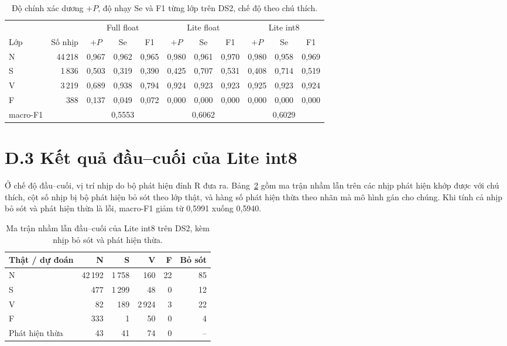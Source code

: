 \begin{table}[htbp]\centering
\caption{Độ chính xác dương $+P$, độ nhạy Se và F1 từng lớp trên DS2, chế độ theo chú thích.}\label{tab:pld-prf}
\small\setlength{\tabcolsep}{4pt}\begin{tabular}{@{}lrccccccccc@{}}\toprule
 & & \multicolumn{3}{c}{Full float} & \multicolumn{3}{c}{Lite float} & \multicolumn{3}{c}{Lite int8} \\
\cmidrule(lr){3-5}\cmidrule(lr){6-8}\cmidrule(l){9-11}
Lớp & Số nhịp & $+P$ & Se & F1 & $+P$ & Se & F1 & $+P$ & Se & F1 \\ \midrule
N & 44\,218 & 0{,}967 & 0{,}962 & 0{,}965 & 0{,}980 & 0{,}961 & 0{,}970 & 0{,}980 & 0{,}958 & 0{,}969 \\
S & 1\,836 & 0{,}503 & 0{,}319 & 0{,}390 & 0{,}425 & 0{,}707 & 0{,}531 & 0{,}408 & 0{,}714 & 0{,}519 \\
V & 3\,219 & 0{,}689 & 0{,}938 & 0{,}794 & 0{,}924 & 0{,}923 & 0{,}923 & 0{,}925 & 0{,}923 & 0{,}924 \\
F & 388 & 0{,}137 & 0{,}049 & 0{,}072 & 0{,}000 & 0{,}000 & 0{,}000 & 0{,}000 & 0{,}000 & 0{,}000 \\
\midrule macro-F1 & & \multicolumn{3}{c}{0{,}5553} & \multicolumn{3}{c}{0{,}6062} & \multicolumn{3}{c}{0{,}6029} \\
\bottomrule\end{tabular}\end{table}

\section*{D.3 Kết quả đầu--cuối của Lite int8}

Ở chế độ đầu--cuối, vị trí nhịp do bộ phát hiện đỉnh R đưa ra.
Bảng~\ref{tab:pld-e2e} gồm ma trận nhầm lẫn trên các nhịp phát hiện khớp được với chú thích, cột số nhịp bị bộ phát hiện bỏ sót theo lớp thật, và hàng số phát hiện thừa theo nhãn mà mô hình gán cho chúng.
Khi tính cả nhịp bỏ sót và phát hiện thừa là lỗi, macro-F1 giảm từ 0{,}5991 xuống 0{,}5940.
\begin{table}[htbp]\centering
\caption{Ma trận nhầm lẫn đầu--cuối của Lite int8 trên DS2, kèm nhịp bỏ sót và phát hiện thừa.}\label{tab:pld-e2e}
\small\begin{tabular}{@{}lrrrrr@{}}\toprule
Thật / dự đoán & N & S & V & F & Bỏ sót \\ \midrule
N & 42\,192 & 1\,758 & 160 & 22 & 85 \\
S & 477 & 1\,299 & 48 & 0 & 12 \\
V & 82 & 189 & 2\,924 & 3 & 22 \\
F & 333 & 1 & 50 & 0 & 4 \\
\midrule Phát hiện thừa & 43 & 41 & 74 & 0 & -- \\
\bottomrule\end{tabular}\end{table}

